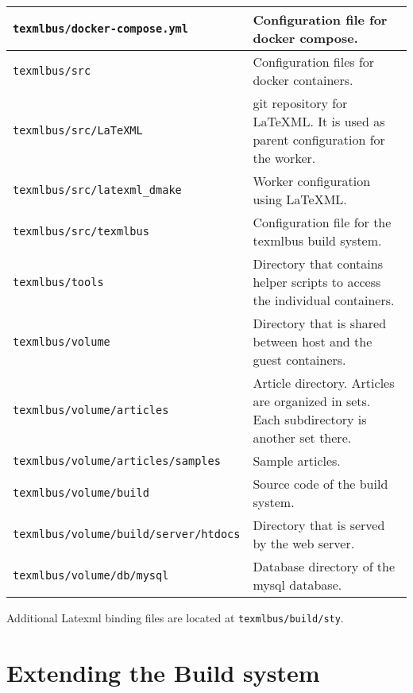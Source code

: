 \documentclass[a4paper]{article}
\begin{document}
\begin{table}[h]
\begin{center}
\begin{tabular}{|p{6cm}|p{6.5cm}|}
\hline
\texttt{texmlbus/docker-compose.yml} & Configuration file for docker compose.\\
\hline
\texttt{texmlbus/src} & Configuration files for docker containers.\\
\hline
\texttt{texmlbus/src/LaTeXML} &
	git repository for \LaTeX ML. It is used as parent configuration for the worker.\\
\hline

\texttt{texmlbus/src/latexml\_dmake} &
	Worker configuration using \LaTeX ML.\\
\hline

\texttt{texmlbus/src/texmlbus} &
	Configuration file for the texmlbus build system.\\
\hline

\texttt{texmlbus/tools} &
	 Directory that contains helper scripts to access the individual containers.\\
\hline

\texttt{texmlbus/volume} &
	Directory that is shared between host and the guest containers.\\
\hline

\texttt{texmlbus/volume/articles} &
	Article directory. Articles are organized in sets. Each subdirectory is another set there.\\ 
\hline

\texttt{texmlbus/volume/articles/samples} &
	Sample articles.\\
\hline

\texttt{texmlbus/volume/build} &
	Source code of the build system.\\ 
\hline

\texttt{texmlbus/volume/build/server/htdocs} &
	Directory that is served by the web server.\\
\hline
\texttt{texmlbus/volume/db/mysql} &
	Database directory of the mysql database.\\ 
\hline
\end{tabular}
\end{center}
\end{table}

Additional Latexml binding files are located at \texttt{texmlbus/build/sty}.



\section{Extending the Build system}
\end{document}
